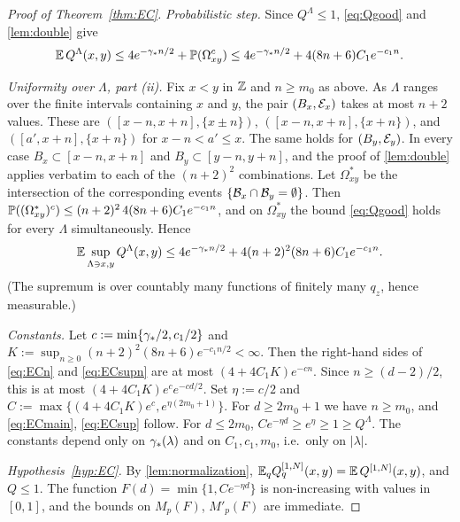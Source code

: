 \begin{proof}[Proof of Theorem~\ref{thm:EC}]
\emph{Probabilistic step.}  Since $Q^\Lambda\le1$, \eqref{eq:Qgood} and \cref{lem:double} give
\begin{equation}\label{eq:ECn}
  \mathbb{E}\,Q^\Lambda(x,y)\le4e^{-\gamma_* n/2}+\mathbb{P}(\Omega_{xy}^c)\le4e^{-\gamma_* n/2}+4(8n+6)C_1e^{-c_1n}.
\end{equation}

\emph{Uniformity over $\Lambda$, part (ii).}  Fix $x<y$ in $\mathbb{Z}$ and $n\ge m_0$ as above.  As $\Lambda$ ranges
over the finite intervals containing $x$ and $y$, the pair $(B_x,\mathcal{E}_x)$ takes at most $n+2$ values.
These are $([x-n,x+n],\{x\pm n\})$, $([x-n,x+n],\{x+n\})$, and $([a',x+n],\{x+n\})$ for $x-n<a'\le x$.  The
same holds for $(B_y,\mathcal{E}_y)$.  In every case $B_x\subset[x-n,x+n]$ and $B_y\subset[y-n,y+n]$, and the proof
of \cref{lem:double} applies verbatim to each of the $(n+2)^2$ combinations.  Let $\Omega^*_{xy}$ be the
intersection of the corresponding events $\{\mathcal{B}_x\cap\mathcal{B}_y=\emptyset\}$.  Then
$\mathbb{P}((\Omega^*_{xy})^c)\le(n+2)^2\,4(8n+6)C_1e^{-c_1n}$, and on $\Omega^*_{xy}$ the bound
\eqref{eq:Qgood} holds for every $\Lambda$ simultaneously.  Hence
\begin{equation}\label{eq:ECsupn}
  \mathbb{E}\sup_{\Lambda\ni x,y}Q^\Lambda(x,y)\le4e^{-\gamma_* n/2}+4(n+2)^2(8n+6)C_1e^{-c_1n}.
\end{equation}
(The supremum is over countably many functions of finitely many $q_z$, hence measurable.)

\emph{Constants.}  Let $c:=\min\{\gamma_*/2,c_1/2\}$ and $K:=\sup_{n\ge0}(n+2)^2(8n+6)e^{-c_1n/2}<\infty$.  Then
the right-hand sides of \eqref{eq:ECn} and \eqref{eq:ECsupn} are at most $(4+4C_1K)e^{-cn}$.  Since
$n\ge(d-2)/2$, this is at most $(4+4C_1K)e^{c}e^{-cd/2}$.  Set $\eta:=c/2$ and
$C:=\max\{(4+4C_1K)e^{c},e^{\eta(2m_0+1)}\}$.  For $d\ge2m_0+1$ we have $n\ge m_0$, and
\eqref{eq:ECmain}, \eqref{eq:ECsup} follow.  For $d\le2m_0$, $Ce^{-\eta d}\ge e^{\eta}\ge1\ge Q^\Lambda$.  The
constants depend only on $\gamma_*(\lambda)$ and on $C_1,c_1,m_0$, i.e.\ only on $|\lambda|$.

\emph{Hypothesis~\ref{hyp:EC}.}  By \cref{lem:normalization},
$\mathbb{E}_qQ^{[1,N]}_q(x,y)=\mathbb{E}\,Q^{[1,N]}(x,y)$, and $Q\le1$.  The function $F(d)=\min\{1,Ce^{-\eta d}\}$ is
non-increasing with values in $[0,1]$, and the bounds on $M_p(F)$, $M'_p(F)$ are immediate.
\end{proof}

